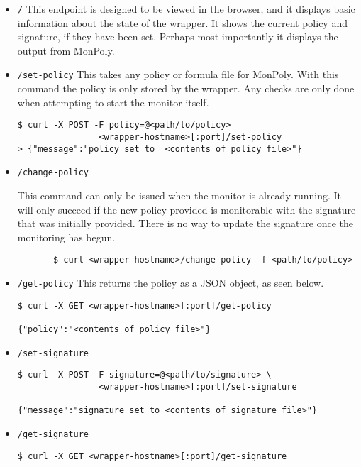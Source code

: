 \begin{itemize}
    \item \texttt{/}
    This endpoint is designed to be viewed in the browser, and it displays basic information about the state of the wrapper.
    It shows the current policy and signature, if they have been set.
    Perhaps most importantly it displays the output from MonPoly.

    \item \texttt{/set-policy}
    This takes any policy or formula file for MonPoly.
    With this command the policy is only stored by the wrapper.
    Any checks are only done when attempting to start the monitor itself.
    \begin{verbatim}
$ curl -X POST -F policy=@<path/to/policy>
                <wrapper-hostname>[:port]/set-policy
> {"message":"policy set to  <contents of policy file>"}
    \end{verbatim}

    \item \texttt{/change-policy}

    This command can only be issued when the monitor is already running.
    It will only succeed if the new policy provided is monitorable with the signature that was initially provided.
    There is no way to update the signature once the monitoring has begun.
    \begin{verbatim}
       $ curl <wrapper-hostname>/change-policy -f <path/to/policy>
    \end{verbatim}
    \item \texttt{/get-policy}
    This returns the policy as a JSON object, as seen below.
    \begin{verbatim}
$ curl -X GET <wrapper-hostname>[:port]/get-policy

{"policy":"<contents of policy file>"}
    \end{verbatim}

    \item \texttt{/set-signature}
    \begin{verbatim}
$ curl -X POST -F signature=@<path/to/signature> \
                <wrapper-hostname>[:port]/set-signature

{"message":"signature set to <contents of signature file>"}
    \end{verbatim}

    \item \texttt{/get-signature}
    \begin{verbatim}
$ curl -X GET <wrapper-hostname>[:port]/get-signature


\end{verbatim}
\end{itemize}
